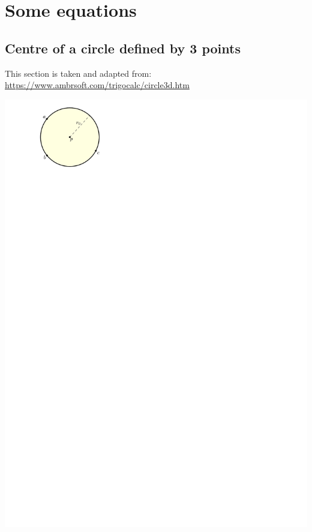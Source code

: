 
\graphicspath{{appendices/equations/figs/}}

\chapter{Some equations}%
\label{app:equations}

%
\section{Centre of a circle defined by 3 points}%
\label{sec:centrecircle}



\begin{kaobox-info}
  This section is taken and adapted from:
  \\
  \url{https://www.ambrsoft.com/trigocalc/circle3d.htm}
\end{kaobox-info}


\begin{marginfigure}
  \centering
  \includegraphics[width=\linewidth]{circle.pdf}
\end{marginfigure}


